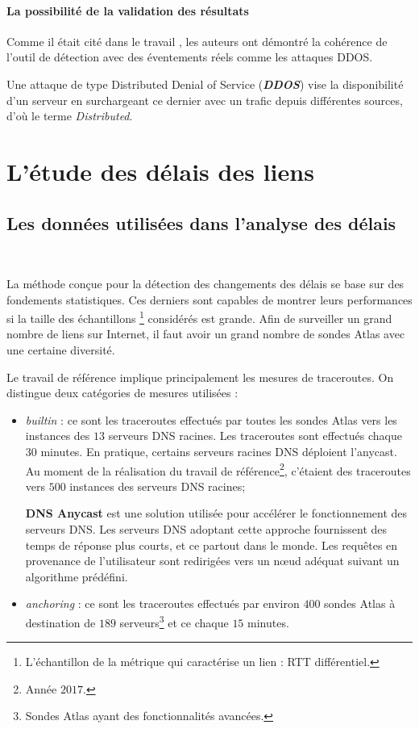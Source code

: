 \paragraph{La possibilité de la validation des résultats}  Comme il était cité dans le travail \cite{DBLP:journals/corr/FontugneAPB16}, les auteurs ont démontré la cohérence de l'outil de détection avec des éventements réels comme les  attaques DDOS.
	
	\begin{tcolorbox}
		Une attaque de type Distributed Denial of Service (\textbf{\textit{DDOS}}) vise la disponibilité d'un serveur en surchargeant ce dernier avec un trafic depuis différentes sources, d'où le terme \textit{Distributed}.
	\end{tcolorbox}
	

\section{L'étude des délais des liens } 

\subsection{Les données utilisées dans l'analyse des délais}~

La méthode conçue pour la détection des changements des délais se base sur des fondements statistiques. Ces derniers sont capables de montrer leurs performances si la taille des échantillons \footnote{L'échantillon de la métrique qui caractérise un lien : RTT différentiel.} considérés est grande.   Afin de surveiller un grand nombre de liens sur Internet, il faut avoir un grand nombre de sondes Atlas avec une certaine diversité.

Le travail de référence implique principalement les mesures de traceroutes. On distingue  deux catégories de mesures  utilisées :

\begin{itemize}
	\item \textit{builtin} : ce sont les traceroutes effectués par toutes les sondes Atlas vers les instances des  $13$ serveurs DNS racines. Les traceroutes sont effectués chaque $30$ minutes. En pratique, certains serveurs racines DNS déploient l'anycast. Au moment de la réalisation du travail de référence\footnote{Année $2017$.}, c'étaient des traceroutes vers $ 500 $ instances des serveurs DNS racines;
	\begin{tcolorbox}
		\textbf{DNS Anycast} est une solution   utilisée pour accélérer le fonctionnement  des serveurs DNS. Les serveurs DNS adoptant cette approche fournissent des temps de réponse plus courts, et ce partout dans le monde. Les requêtes en provenance de l'utilisateur sont redirigées vers un n\oe{}ud adéquat suivant un algorithme prédéfini. 
	\end{tcolorbox}
	
	\item \textit{anchoring} : ce sont les traceroutes effectués par environ $400$ sondes Atlas à destination de $189$ serveurs\footnote{Sondes Atlas ayant des fonctionnalités avancées.} et ce chaque $15$ minutes.
\end{itemize}

